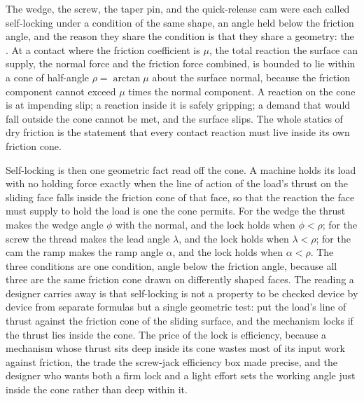 \begin{mastery}
The wedge, the screw, the taper pin, and the quick-release cam were each called
self-locking under a condition of the same shape, an angle held below the
friction angle, and the reason they share the condition is that they share a
geometry: the . At a contact where the friction
coefficient is $\mu$, the total reaction the surface can supply, the normal
force and the friction force combined, is bounded to lie within a cone of
half-angle $\rho = \arctan\mu$ about the surface normal, because the friction
component cannot exceed $\mu$ times the normal component. A reaction on the cone
is at impending slip; a reaction inside it is safely gripping; a demand that
would fall outside the cone cannot be met, and the surface slips. The whole
statics of dry friction is the statement that every contact reaction must live
inside its own friction cone.

Self-locking is then one geometric fact read off the cone. A machine holds its
load with no holding force exactly when the line of action of the load's thrust
on the sliding face falls inside the friction cone of that face, so that the
reaction the face must supply to hold the load is one the cone permits. For the
wedge the thrust makes the wedge angle $\phi$ with the normal, and the lock
holds when $\phi < \rho$; for the screw the thread makes the lead angle
$\lambda$, and the lock holds when $\lambda < \rho$; for the cam the ramp makes
the ramp angle $\alpha$, and the lock holds when $\alpha < \rho$. The three
conditions are one condition, angle below the friction angle, because all three
are the same friction cone drawn on differently shaped faces. The reading a
designer carries away is that self-locking is not a property to be checked
device by device from separate formulas but a single geometric test: put the
load's line of thrust against the friction cone of the sliding surface, and the
mechanism locks if the thrust lies inside the cone. The price of the lock is
efficiency, because a mechanism whose thrust sits deep inside its cone wastes
most of its input work against friction, the trade the screw-jack efficiency box
made precise, and the designer who wants both a firm lock and a light effort
sets the working angle just inside the cone rather than deep within it.
\end{mastery}





